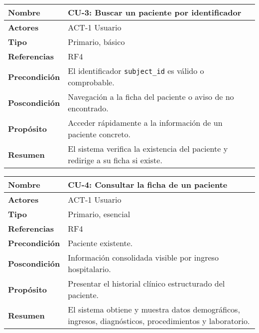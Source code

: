 \begin{table}[H]
    \centering
    \begin{tabular}{|l|p{11cm}|}
        \hline
        \textbf{Nombre} & CU-3: Buscar un paciente por identificador \\
        \hline
        \textbf{Actores} & ACT-1 Usuario \\
        \hline
        \textbf{Tipo} & Primario, básico \\
        \hline
        \textbf{Referencias} & RF4 \\
        \hline
        \textbf{Precondición} & El identificador \texttt{subject\_id} es válido o comprobable. \\
        \hline
        \textbf{Poscondición} & Navegación a la ficha del paciente o aviso de no encontrado. \\
        \hline
        \textbf{Propósito} & Acceder rápidamente a la información de un paciente concreto. \\
        \hline
        \textbf{Resumen} & El sistema verifica la existencia del paciente y redirige a su ficha si existe. \\
        \hline
    \end{tabular}
\end{table}

\begin{table}[H]
    \centering
    \begin{tabular}{|l|p{11cm}|}
        \hline
        \textbf{Nombre} & CU-4: Consultar la ficha de un paciente \\
        \hline
        \textbf{Actores} & ACT-1 Usuario \\
        \hline
        \textbf{Tipo} & Primario, esencial \\
        \hline
        \textbf{Referencias} & RF4 \\
        \hline
        \textbf{Precondición} & Paciente existente. \\
        \hline
        \textbf{Poscondición} & Información consolidada visible por ingreso hospitalario. \\
        \hline
        \textbf{Propósito} & Presentar el historial clínico estructurado del paciente. \\
        \hline
        \textbf{Resumen} & El sistema obtiene y muestra datos demográficos, ingresos, diagnósticos, procedimientos y laboratorio. \\
        \hline
    \end{tabular}
\end{table}

